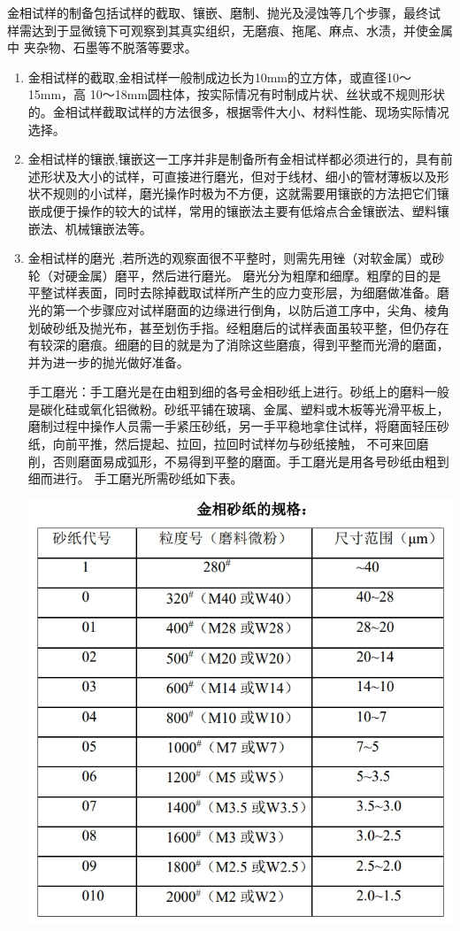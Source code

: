 \documentclass[a4paper,utf8]{article}
\begin{document}
金相试样的制备包括试样的截取、镶嵌、磨制、抛光及浸蚀等几个步骤，最终试
样需达到于显微镜下可观察到其真实组织，无磨痕、拖尾、麻点、水渍，并使金属中
夹杂物、石墨等不脱落等要求。
    \begin{enumerate}
        \item 金相试样的截取,金相试样一般制成边长为10mm的立方体，或直径10～15mm，高 10～18mm圆柱体，按实际情况有时制成片状、丝状或不规则形状的。金相试样截取试样的方法很多，根据零件大小、材料性能、现场实际情况选择。
        
        \item 金相试样的镶嵌,镶嵌这一工序并非是制备所有金相试样都必须进行的，具有前述形状及大小的试样，可直接进行磨光，但对于线材、细小的管材薄板以及形状不规则的小试样，磨光操作时极为不方便，这就需要用镶嵌的方法把它们镶嵌成便于操作的较大的试样，常用的镶嵌法主要有低熔点合金镶嵌法、塑料镶嵌法、机械镶嵌法等。

        \item 金相试样的磨光 ,若所选的观察面很不平整时，则需先用锉（对软金属）或砂轮（对硬金属）磨平，然后进行磨光。
        磨光分为粗摩和细摩。粗摩的目的是平整试样表面，同时去除掉截取试样所产生的应力变形层，为细磨做准备。磨光的第一个步骤应对试样磨面的边缘进行倒角，以防后道工序中，尖角、棱角划破砂纸及抛光布，甚至划伤手指。经粗磨后的试样表面虽较平整，但仍存在有较深的磨痕。细磨的目的就是为了消除这些磨痕，得到平整而光滑的磨面，并为进一步的抛光做好准备。
        
        手工磨光：手工磨光是在由粗到细的各号金相砂纸上进行。砂纸上的磨料一般是碳化硅或氧化铝微粉。砂纸平铺在玻璃、金属、塑料或木板等光滑平板上，
        磨制过程中操作人员需一手紧压砂纸，另一手平稳地拿住试样，将磨面轻压砂纸，向前平推，然后提起、拉回，拉回时试样勿与砂纸接触，
        不可来回磨削，否则磨面易成弧形，不易得到平整的磨面。手工磨光是用各号砂纸由粗到细而进行。
        手工磨光所需砂纸如下表。

        \begin{center}
            \includegraphics[width=400pt]{1.png}
        \end{center}


\end{enumerate}
\end{document}

